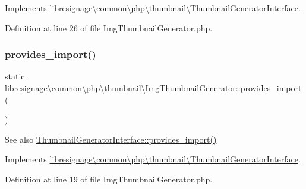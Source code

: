 Implements \hyperlink{interfacelibresignage_1_1common_1_1php_1_1thumbnail_1_1ThumbnailGeneratorInterface_a8740f912c85094c22b397f7df0142cde}{libresignage\textbackslash{}common\textbackslash{}php\textbackslash{}thumbnail\textbackslash{}\+Thumbnail\+Generator\+Interface}.



Definition at line 26 of file Img\+Thumbnail\+Generator.\+php.

\mbox{\label{classlibresignage_1_1common_1_1php_1_1thumbnail_1_1ImgThumbnailGenerator_a3fc7c9aedf448fcc6959ce18ffca35cb}} 
\subsubsection{\texorpdfstring{provides\+\_\+import()}{provides\_import()}}
{\footnotesize\ttfamily static libresignage\textbackslash{}common\textbackslash{}php\textbackslash{}thumbnail\textbackslash{}\+Img\+Thumbnail\+Generator\+::provides\+\_\+import (\begin{DoxyParamCaption}{ }\end{DoxyParamCaption})\hspace{0.3cm}{\ttfamily [static]}}

\begin{DoxySeeAlso}{See also}
\hyperlink{interfacelibresignage_1_1common_1_1php_1_1thumbnail_1_1ThumbnailGeneratorInterface_a2fe5cbf9b09b7ef8416cfa86999aaab8}{Thumbnail\+Generator\+Interface\+::provides\+\_\+import()} 
\end{DoxySeeAlso}


Implements \hyperlink{interfacelibresignage_1_1common_1_1php_1_1thumbnail_1_1ThumbnailGeneratorInterface_a2fe5cbf9b09b7ef8416cfa86999aaab8}{libresignage\textbackslash{}common\textbackslash{}php\textbackslash{}thumbnail\textbackslash{}\+Thumbnail\+Generator\+Interface}.



Definition at line 19 of file Img\+Thumbnail\+Generator.\+php.

\mbox{\label{classlibresignage_1_1common_1_1php_1_1thumbnail_1_1ImgThumbnailGenerator_a12a12f8a06bd74996dae867a7918266a}} 
